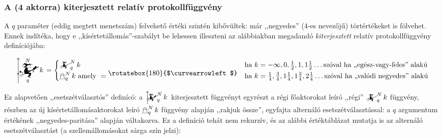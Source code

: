 \documentclass{article}
\newcommand{\nothing}{\text{\raisebox{0.4em}{\rotatebox{180}{$\curvearrowleft$}}}}%
\newcommand{\mainfuncomm}[3]{\mathwitch_{#2}^{#1}#3}
\newcommand{\mainfunext}[3]{\left\uparrow\!\!\!\mathwitch*_{#2}^{#1}#3\right.}
\newcommand{\gbh}[3]{\mathop{\mathghost}^{#1}_{#2}#3}
\begin{document}
	\subsubsection{A (4 aktorra) kiterjesztett relatív protokollfüggvény}

	A $q$ paraméter (eddig megtett menetszám) felvehető értéki szintén kibővültek: már ,,negyedes'' (4-es nevezőjű) törtértékeket is fölvehet. Ennek indítéka, hogy e ,,kísértetállomás''-szabályt be lehessen illeszteni az alábbiakban megadandó \emph{kiterjesztett} relatív protokollfüggvény definíciójába:

	\[
		\mainfunext Nqk =
		\begin{cases}
			\mainfuncomm Nqk & \text{ha } k = -\infty, 0, \frac12, 1, 1\frac12\dots \text{szóval ha ,,egész-vagy-feles'' alakú}\\
			\gbh Nqk \text{ amely } =\nothing & \text{ha } k = \frac14, \frac34, 1\frac14, 1\frac34, 2\frac14\dots \text{szóval ha ,,valódi negyedes'' alakú}
		\end{cases}
	\]

	Ez alapvetően  ,,esetszétválasztós'' definícó: a $\mainfunext Nqk$ kiterjesztett függvényt egyrészt a régi főaktorokat leíró ,,régi'' $\mainfuncomm Nqk$ függvény, részben az új kísértetállomásaktorokat leíró $\gbh Nqk$ függvény alapján ,,rakjuk össze'', egyfajta alternáló esetszétválasztással: a $q$ argumentum értékének ,,negyedes-paritása'' alapján váltakozva.
	Ez a definíció tehát nem rekurzív, és az alábbi értéktáblázat mutatja is az alternáló esetszétválasztást (a szellemállomásokat sárga szín jelzi):
\end{document}
